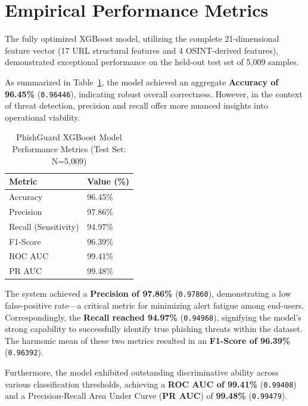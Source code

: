 \section{Empirical Performance
Metrics}\label{empirical-performance-metrics}

The fully optimized XGBoost model, utilizing the complete 21-dimensional
feature vector (17 URL structural features and 4 OSINT-derived
features), demonstrated exceptional performance on the held-out test set
of 5,009 samples. 

As summarized in Table~\ref{tab:performance_metrics}, the model achieved an aggregate \textbf{Accuracy of 96.45\%}
(\texttt{0.96446}), indicating robust overall correctness. However, in
the context of threat detection, precision and recall offer more nuanced
insights into operational viability.

\begin{table}[htbp]
\centering
\caption{PhishGuard XGBoost Model Performance Metrics (Test Set: N=5,009)}
\label{tab:performance_metrics}
\renewcommand{\arraystretch}{1.3}
\begin{tabular}{@{}ll@{}}
\toprule
\textbf{Metric} & \textbf{Value (\%)} \\
\midrule
Accuracy & 96.45\% \\
Precision & 97.86\% \\
Recall (Sensitivity) & 94.97\% \\
F1-Score & 96.39\% \\
ROC AUC & 99.41\% \\
PR AUC & 99.48\% \\
\bottomrule
\end{tabular}
\end{table}

The system achieved a \textbf{Precision of 97.86\%} (\texttt{0.97860}),
demonstrating a low false-positive rate---a critical metric for
minimizing alert fatigue among end-users. Correspondingly, the
\textbf{Recall reached 94.97\%} (\texttt{0.94968}), signifying the
model's strong capability to successfully identify true phishing threats
within the dataset. The harmonic mean of these two metrics resulted in
an \textbf{F1-Score of 96.39\%} (\texttt{0.96392}).

Furthermore, the model exhibited outstanding discriminative ability
across various classification thresholds, achieving a \textbf{ROC AUC of
99.41\%} (\texttt{0.99408}) and a Precision-Recall Area Under Curve
(\textbf{PR AUC}) of \textbf{99.48\%} (\texttt{0.99479}).

